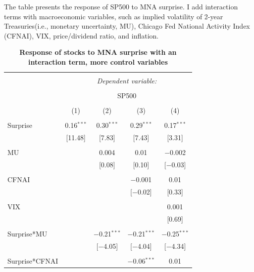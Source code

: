 \documentclass[12pt]{article}
\begin{document}

\begin{table}[!htbp] \centering 
  \caption{\textbf{Response of stocks to MNA surprise with an interaction term, more control variables}} 
  \label{} 
    \begin{flushleft}
    {\medskip\small
 The table presents the response of SP500 to MNA surprise. I add interaction terms with macroeconomic variables, such as implied volatility of 2-year Treasuries(i.e., monetary uncertainty, MU), Chicago Fed National Activity Index (CFNAI), VIX, price/dividend ratio, and inflation.}
    \medskip
    \end{flushleft}
  \small
\begin{tabular}{@{\extracolsep{5pt}}lcccc} 
\\[-1.8ex]\hline 
\hline \\[-1.8ex] 
 & \multicolumn{4}{c}{\textit{Dependent variable:}} \\ 
\cline{2-5} 
\\[-1.8ex] & \multicolumn{4}{c}{SP500} \\ 
\\[-1.8ex] & (1) & (2) & (3) & (4)\\ 
\hline \\[-1.8ex] 
 Surprise & 0.16$^{***}$ & 0.30$^{***}$ & 0.29$^{***}$ & 0.17$^{***}$ \\ 
  & [11.48] & [7.83] & [7.43] & [3.31] \\ 
  & & & & \\ 
 MU &  & 0.004 & 0.01 & $-$0.002 \\ 
  &  & [0.08] & [0.10] & [$-$0.03] \\ 
  & & & & \\ 
 CFNAI &  &  & $-$0.001 & 0.01 \\ 
  &  &  & [$-$0.02] & [0.33] \\ 
  & & & & \\ 
 VIX &  &  &  & 0.001 \\ 
  &  &  &  & [0.69] \\ 
  & & & & \\ 
 Surprise*MU &  & $-$0.21$^{***}$ & $-$0.21$^{***}$ & $-$0.25$^{***}$ \\ 
  &  & [$-$4.05] & [$-$4.04] & [$-$4.34] \\ 
  & & & & \\ 
 Surprise*CFNAI &  &  & $-$0.06$^{***}$ & 0.01 \\ 

\end{tabular}
\end{table}
\end{document}
